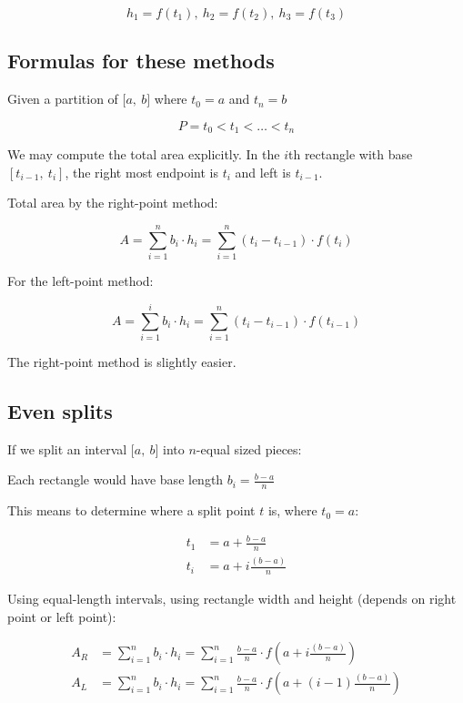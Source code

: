 \documentclass[12pt]{article}
\theoremstyle{plain}
\theoremstyle{remark}
\theoremstyle{definition}
\begin{document}
\[h_{1} = f\left( t_{1} \right),\ h_{2} = f\left( t_{2} \right),\ h_{3} = f\left( t_{3} \right)\]


\subsection{Formulas for these
methods}

Given a partition of \(\lbrack a,\ b\rbrack\) where \(t_{0} = a\) and
\(t_{n} = b\)

\[P = t_{0} < t_{1} < \ldots < t_{n}\]

We may compute the total area explicitly. In the \(i\)th rectangle with
base \(\left\lbrack t_{i - 1},\ t_{i} \right\rbrack\), the right most
endpoint is \(t_{i}\) and left is \(t_{i - 1}\).

Total area by the right-point method:

\[A = \sum_{i = 1}^{n}{b_{i} \cdot h_{i}} = \sum_{i = 1}^{n}{\left( t_{i} - t_{i - 1} \right) \cdot f\left( t_{i} \right)}\]

For the left-point method:

\[A = \sum_{i = 1}^{i}{b_{i} \cdot h_{i}} = \sum_{i = 1}^{n}{\left( t_{i} - t_{i - 1} \right) \cdot f(t_{i - 1})}\]

The right-point method is slightly easier.


\subsection{Even splits}


If we split an interval \(\lbrack a,\ b\rbrack\) into \(n\)-equal sized
pieces:

Each rectangle would have base length \(b_{i} = \frac{b - a}{n}\)

This means to determine where a split point \(t\) is, where
\(t_{0} = a\):

\begin{align*}
t_{1} &= a + \frac{b - a}{n} \\
t_{i} &= a + i\frac{(b - a)}{n}
\end{align*}


Using equal-length intervals, using rectangle width and height (depends
on right point or left point):

\begin{align*}
A_{R} &= \sum_{i = 1}^{n}{b_{i} \cdot h_{i}} = \sum_{i = 1}^{n}{\frac{b - a}{n} \cdot f\left( a + i\frac{(b - a)}{n} \right)} \\
A_{L} &= \sum_{i = 1}^{n}{b_{i} \cdot h_{i}} = \sum_{i = 1}^{n}{\frac{b - a}{n} \cdot f\left( a + (i - 1)\frac{(b - a)}{n} \right)}
\end{align*}
\end{document}
